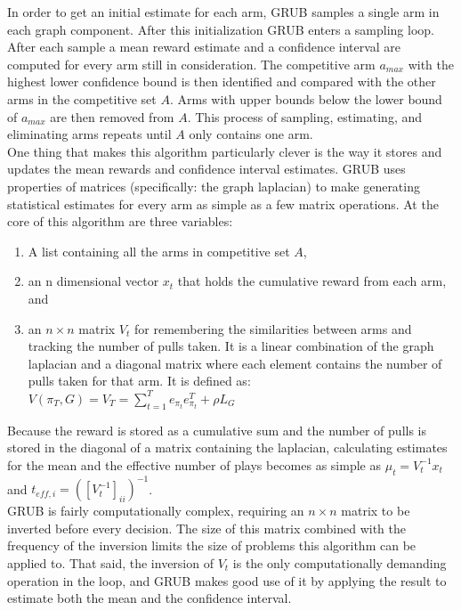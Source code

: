 \documentclass{article}[12pt]
\begin{document}
In order to get an initial estimate for each arm, GRUB samples a single arm in each graph component.
After this initialization GRUB enters a sampling loop.
After each sample a mean reward estimate and a confidence interval are computed for every arm still in consideration.
The competitive arm $a_{max}$ with the highest lower confidence bound is then identified and compared with the other arms in the competitive set $A$.
Arms with upper bounds below the lower bound of $a_{max}$ are then removed from $A$.
This process of sampling, estimating, and eliminating arms repeats until $A$ only contains one arm. \\


One thing that makes this algorithm particularly clever is the way it stores and updates the mean rewards and confidence interval estimates.
GRUB uses properties of matrices (specifically: the graph laplacian) to make generating statistical estimates for every arm as simple as a few matrix operations.
At the core of this algorithm are three variables:
\begin{enumerate}
    \item A list containing all the arms in competitive set $A$,
    \item an n dimensional vector $x_t$ that holds the cumulative reward from each arm, and
    \item an $n \times n$ matrix $V_t$ for remembering the similarities between arms and tracking the number of pulls taken.
    It is a linear combination of the graph laplacian and a diagonal matrix where each element contains the number of pulls taken for that arm.
        It is defined as: $ V(\pi_T, G) = V_T = \sum_{t=1}^T e_{\pi_t} e_{\pi_t}^T + \rho L_G $
 		
\end{enumerate}

Because the reward is stored as a cumulative sum and the number of pulls is stored in the diagonal of a matrix containing the laplacian,
calculating estimates for the mean and the effective number of plays becomes as simple as $\mu_t = V_t^{-1} x_t$ and $t_{eff,i} = \left( \left[ V_t^{-1} \right]_{ii} \right)^{-1}$. \\

GRUB is fairly computationally complex, requiring an $n \times n$ matrix to be inverted before every decision.
The size of this matrix combined with the frequency of the inversion limits the size of problems this algorithm can be applied to.
That said, the inversion of $V_t$ is the only computationally demanding operation in the loop,
and GRUB makes good use of it by applying the result to estimate both the mean and the confidence interval. \\
\end{document}
